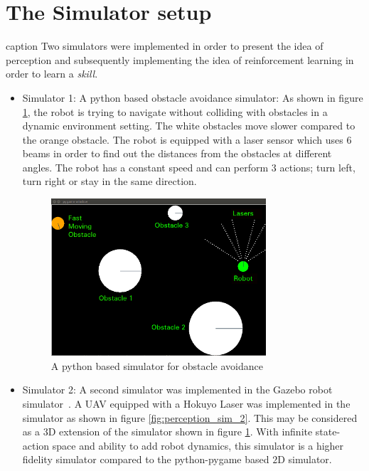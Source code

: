 \documentclass[12pt]{report}
\begin{document}
\section{The Simulator setup}caption
\label{sims}
Two simulators were implemented in order to present the idea of perception and subsequently implementing the idea of reinforcement learning in order to learn a \textit{skill}.
\begin{itemize}
\item Simulator 1: A python based obstacle avoidance simulator: As shown in figure \ref{fig:perception_sim_1}, the robot is trying to navigate without colliding with obstacles in a dynamic environment setting. The white obstacles move slower compared to the orange obstacle. The robot is equipped with a laser sensor which uses $6$ beams in order to find out the distances from the obstacles at different angles. The robot has a constant speed and can perform $3$ actions; turn left, turn right or stay in the same direction. 

\begin{figure}[htp]
	\centering
	\includegraphics[width=8cm]{perception_sim_1.png}
	\caption {A python based simulator for obstacle avoidance}
   \label{fig:perception_sim_1}
\end{figure}

\item Simulator 2: A second simulator was implemented in the Gazebo robot simulator~\cite{koenig2004design}. A UAV equipped with a Hokuyo Laser was implemented in the simulator as shown in figure \ref{fig:perception_sim_2}. This may be considered as a $3$D extension of the simulator shown in figure \ref{fig:perception_sim_1}. With infinite state-action space and ability to add robot dynamics, this simulator is a higher fidelity simulator compared to the python-pygame based $2$D simulator. 


\end{itemize}
\end{document}
